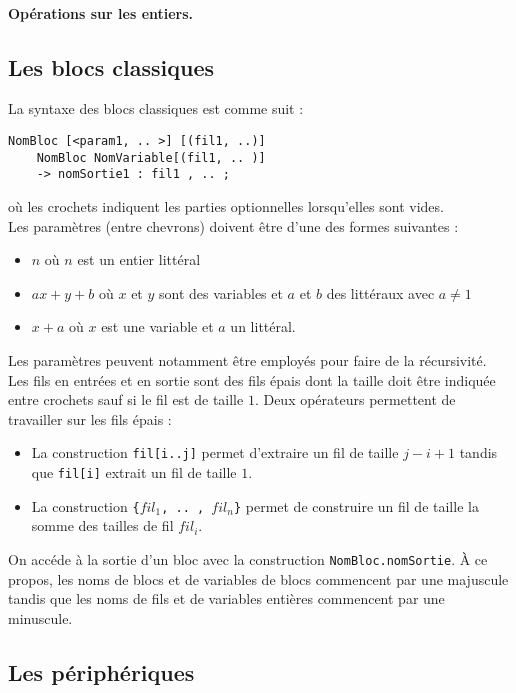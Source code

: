 \documentclass{article}
\begin{document}
\paragraph{Opérations sur les entiers.}



\subsection{Les blocs classiques}
La syntaxe des blocs classiques est comme suit :
\begin{verbatim}
NomBloc [<param1, .. >] [(fil1, ..)]
    NomBloc NomVariable[(fil1, .. )]
    -> nomSortie1 : fil1 , .. ;
\end{verbatim}

où les crochets indiquent les parties optionnelles lorsqu'elles sont vides. \\
Les paramètres (entre chevrons) doivent être d'une des formes suivantes :
\begin{itemize}
\item$n$ où $n$ est un entier littéral
\item$ax + y + b$ où $x$ et $y$ sont des variables et $a$ et $b$ des littéraux avec $a \neq 1$
\item$x + a$ où $x$ est une variable et $a$ un littéral. 
\end{itemize}
Les paramètres peuvent notamment être employés pour faire de la récursivité.\\
Les fils en entrées et en sortie sont des fils épais dont la taille doit être indiquée entre crochets sauf si le fil est de taille $1$. Deux opérateurs permettent de travailler sur les fils épais :
\begin{itemize}
\item La construction \texttt{fil[i..j]} permet d'extraire un fil de taille $j - i + 1$ tandis que \texttt{fil[i]} extrait un fil de taille $1$.
\item La construction \texttt{\{$fil_{1}$, .. , $fil_{n}$\}} permet de construire un fil de taille la somme des tailles de fil $fil_{i}$.
\end{itemize}
On accéde à la sortie d'un bloc avec la construction \texttt{NomBloc.nomSortie}. À ce propos, les noms de blocs et de variables de blocs commencent par une majuscule tandis que les noms de fils et de variables entières commencent par une minuscule. 


\subsection{Les périphériques}
\end{document}
